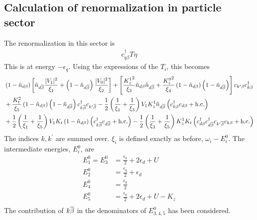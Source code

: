 \documentclass[12pt,twoside]{report}
\numberwithin{equation}{section}
\begin{document}
\subsection{Calculation of renormalization in particle sector}
The renormalization in this sector is
\begin{equation}\begin{aligned}
	c^\dagger_{q\beta} T \eta
\end{aligned}\end{equation}
This is at energy \(-\epsilon_q\).
Using the expressions of the \(T_i\), this becomes
\begin{equation}\begin{aligned}
	&\left(1 - \hat n_{d\beta}\right)\left[\hat n_{d\overline\beta}\frac{|V_1|^2}{\xi_1} + \left(1 - \hat n_{d\overline\beta}\right)\frac{|V_0|^2}{\xi_2}\right] + \left[\frac{{K_z^1}^2}{\xi_3}\hat n_{d\beta}\hat n_{d\overline\beta} + \frac{{K_z^0}^2}{\xi_4}\left(1 - \hat n_{d\beta}\right)\left(1 - \hat n_{d\overline\beta}\right)\right]c_{k^\prime\beta}c^\dagger_{k\beta} \\
	&+ \frac{K_t^2}{\xi_5}\left(1 - \hat n_{d\beta}\right)\left(1 - \hat n_{d\overline\beta}\right)c^\dagger_{k\overline\beta}c_{k^\prime\overline\beta} - \frac{1}{2}\left(\frac{1}{\xi_1} + \frac{1}{\xi_3} \right)V_1 K_z^1 \hat n_{d\overline\beta}\left(c^\dagger_{k\beta}c_{d\beta} + \text{h.c.}\right) \\
	&+ \frac{1}{2}\left(\frac{1}{\xi_1} + \frac{1}{\xi_5} \right)V_1 K_t \left(1 - \hat n_{d\beta}\right)\left(c^\dagger_{k\overline\beta}c_{d\overline\beta} + \text{h.c.}\right)- \frac{1}{2}\left(\frac{1}{\xi_3} + \frac{1}{\xi_5} \right)K_z^1 K_t \left(c^\dagger_{d\beta}c^\dagger_{d\overline\beta}c_{k^\prime\overline\beta}c_{k\beta} + \text{h.c.}\right)
\end{aligned}\end{equation}
The indices \(k,k^\prime\) are summed over.
\(\xi_i\) is defined exactly as before, \(\omega_i - E_i^0\).
\pb The intermediate energies, \(E_i^0\), are
\begin{equation}\begin{aligned}
	E^0_1 = E_3^0 &= \frac{\epsilon_q}{2} + 2\epsilon_d + U\\
	E^0_2 &= \frac{\epsilon_q}{2} + \epsilon_d \\
	E^0_4 &= \frac{\epsilon_q}{2}\\
	E_5^0 &= \frac{\epsilon_q}{2} + 2\epsilon_d + U - K_z\\
\end{aligned}\end{equation}
The contribution of \(k\overline\beta\) in the denominators of \(E^0_{3,4,5}\) has been considered.
\end{document}
